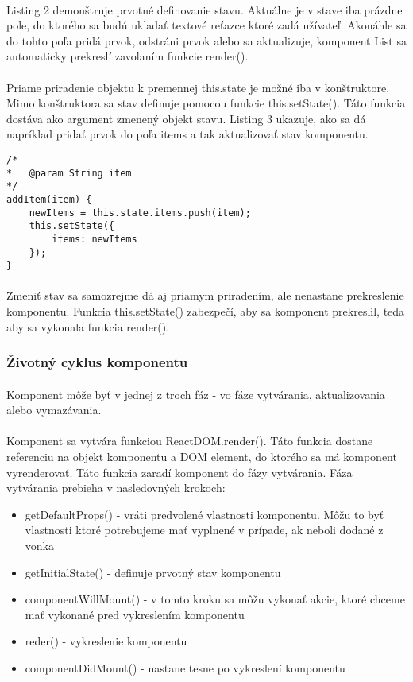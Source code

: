 \paragraph{}
Listing 2 demonštruje prvotné definovanie stavu. Aktuálne je v stave iba prázdne pole, do ktorého sa budú ukladať textové reťazce ktoré zadá užívateľ. Akonáhle sa do tohto poľa pridá prvok, odstráni prvok alebo sa aktualizuje, komponent List sa automaticky prekreslí zavolaním funkcie render().
\paragraph{}
Priame priradenie objektu k premennej this.state je možné iba v konštruktore. Mimo konštruktora sa stav definuje pomocou funkcie this.setState(). Táto funkcia dostáva ako argument zmenený objekt stavu. Listing 3 ukazuje, ako sa dá napríklad pridať prvok do poľa items a tak aktualizovať stav komponentu.
\begin{lstlisting}[caption=Aktualizovanie stavu komponentu]
/*
*	@param String item
*/
addItem(item) {
	newItems = this.state.items.push(item);
	this.setState({
		items: newItems
	});
}
\end{lstlisting}
\paragraph{}
Zmeniť stav sa samozrejme dá aj priamym priradením, ale nenastane prekreslenie komponentu. Funkcia this.setState() zabezpečí, aby sa komponent prekreslil, teda aby sa vykonala funkcia render().

\subsubsection{Životný cyklus komponentu}
\paragraph{}
Komponent môže byť v jednej z troch fáz - vo fáze vytvárania, aktualizovania alebo vymazávania.
\paragraph{}
Komponent sa vytvára funkciou ReactDOM.render(). Táto funkcia dostane referenciu na objekt komponentu a DOM element, do ktorého sa má komponent vyrenderovať. Táto funkcia zaradí komponent do fázy vytvárania. Fáza vytvárania prebieha v nasledovných krokoch:
\begin{itemize}
	\item getDefaultProps() - vráti predvolené vlastnosti komponentu. Môžu to byť vlastnosti ktoré potrebujeme mať vyplnené v prípade, ak neboli dodané z vonka
	\item getInitialState() - definuje prvotný stav komponentu
	\item componentWillMount() - v tomto kroku sa môžu vykonať akcie, ktoré chceme mať vykonané pred vykreslením komponentu
	\item reder() - vykreslenie komponentu
	\item componentDidMount() - nastane tesne po vykreslení komponentu
\end{itemize}

